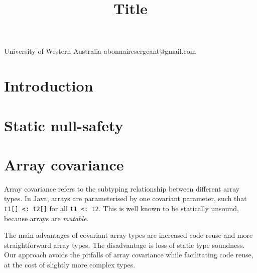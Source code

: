 \documentclass[preprint]{sigplanconf}
\begin{document}
\copyrightdata{[to be supplied]} 


\title{Title}

           {University of Western Australia}
           {abonnairesergeant@gmail.com}

\maketitle

\begin{abstract}
\end{abstract}



\terms

\keywords

\section{Introduction}

\section{Static null-safety}

\section{Array covariance}

Array covariance refers to the subtyping relationship between different array types.
In Java, arrays are parameterised by one covariant parameter, such that
\lstinline|t1[] <: t2[]| for all \lstinline|t1 <: t2|. This is well known to be statically unsound,
because arrays are \emph{mutable}. 

The main advantages of covariant array types are increased code reuse
and more straightforward array types.
The disadvantage is loss of static type soundness.
Our approach avoids the pitfalls of array covariance
while facilitating code reuse, at the cost of slightly more complex types.
\end{document}
